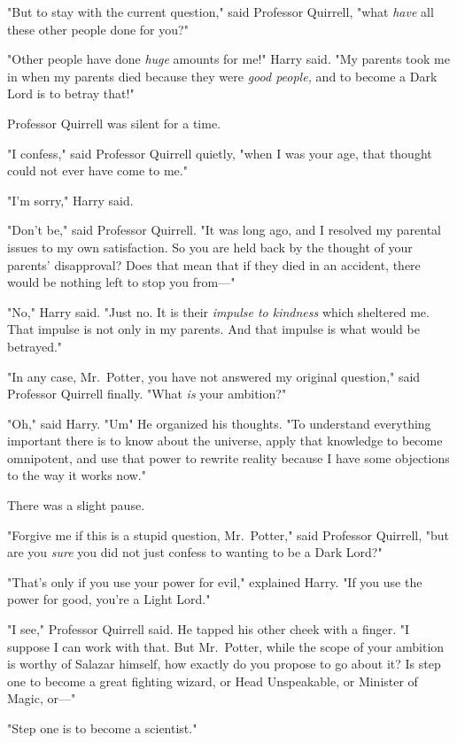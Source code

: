"But to stay with the current question," said Professor Quirrell, "what
\emph{have} all these other people done for you?"

"Other people have done \emph{huge} amounts for me!" Harry said. "My parents
took me in when my parents died because they were \emph{good people,} and to
become a Dark Lord is to betray that!"

Professor Quirrell was silent for a time.

"I confess," said Professor Quirrell quietly, "when I was your age, that
thought could not ever have come to me."

"I'm sorry," Harry said.

"Don't be," said Professor Quirrell. "It was long ago, and I resolved my
parental issues to my own satisfaction. So you are held back by the thought of
your parents' disapproval? Does that mean that if they died in an accident,
there would be nothing left to stop you from\mbox{---}"

"No," Harry said. "Just no. It is their \emph{impulse to kindness} which
sheltered me. That impulse is not only in my parents. And that impulse is what
would be betrayed."

"In any case, Mr.~Potter, you have not answered my original question," said
Professor Quirrell finally. "What \emph{is} your ambition?"

"Oh," said Harry. "Um{\el}" He organized his thoughts. "To understand everything
important there is to know about the universe, apply that knowledge to become
omnipotent, and use that power to rewrite reality because I have some
objections to the way it works now."

There was a slight pause.

"Forgive me if this is a stupid question, Mr.~Potter," said Professor Quirrell,
"but are you \emph{sure} you did not just confess to wanting to be a Dark Lord?"

"That's only if you use your power for evil," explained Harry. "If you use the
power for good, you're a Light Lord."

"I see," Professor Quirrell said. He tapped his other cheek with a finger. "I
suppose I can work with that. But Mr.~Potter, while the scope of your ambition
is worthy of Salazar himself, how exactly do you propose to go about it? Is
step one to become a great fighting wizard, or Head Unspeakable, or Minister of
Magic, or\mbox{---}"

"Step one is to become a scientist."

